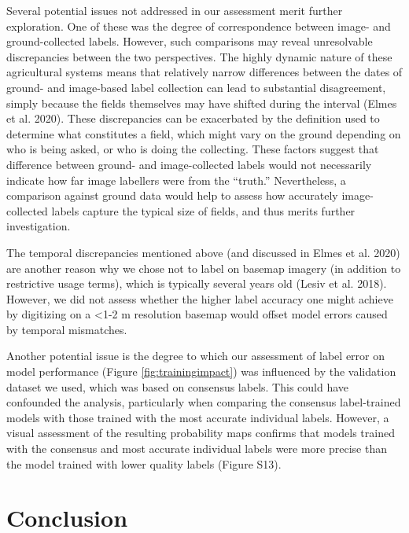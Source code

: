 \documentclass[11pt,a4paper]{article}
\begin{document}
Several potential issues not addressed in our assessment merit further
exploration. One of these was the degree of correspondence between
image- and ground-collected labels. However, such comparisons may reveal
unresolvable discrepancies between the two perspectives. The highly
dynamic nature of these agricultural systems means that relatively
narrow differences between the dates of ground- and image-based label
collection can lead to substantial disagreement, simply because the
fields themselves may have shifted during the interval (Elmes et al.
2020). These discrepancies can be exacerbated by the definition used to
determine what constitutes a field, which might vary on the ground
depending on who is being asked, or who is doing the collecting. These
factors suggest that difference between ground- and image-collected
labels would not necessarily indicate how far image labellers were from
the ``truth.'' Nevertheless, a comparison against ground data would help
to assess how accurately image-collected labels capture the typical size
of fields, and thus merits further investigation.

The temporal discrepancies mentioned above (and discussed in Elmes et
al. 2020) are another reason why we chose not to label on basemap
imagery (in addition to restrictive usage terms), which is typically
several years old (Lesiv et al. 2018). However, we did not assess
whether the higher label accuracy one might achieve by digitizing on a
\textless1-2 m resolution basemap would offset model errors caused by
temporal mismatches.

Another potential issue is the degree to which our assessment of label
error on model performance (Figure \ref{fig:trainingimpact}) was
influenced by the validation dataset we used, which was based on
consensus labels. This could have confounded the analysis, particularly
when comparing the consensus label-trained models with those trained
with the most accurate individual labels. However, a visual assessment
of the resulting probability maps confirms that models trained with the
consensus and most accurate individual labels were more precise than the
model trained with lower quality labels (Figure S13).

\hypertarget{conclusion}{%
\section{Conclusion}\label{conclusion}}
\end{document}
